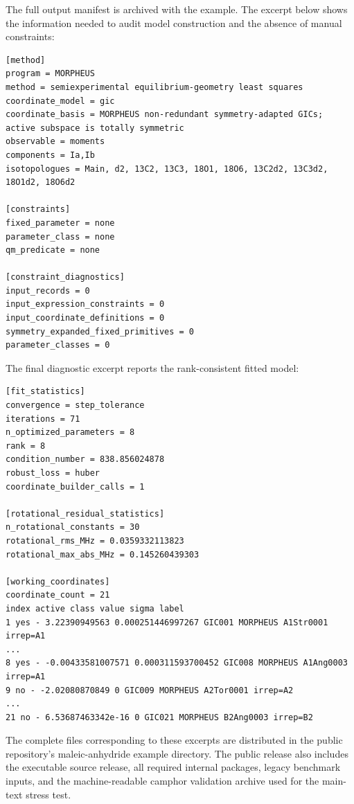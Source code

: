 \documentclass[12pt]{article}
\begin{document}
The full output manifest is archived with the example. The excerpt below shows
the information needed to audit model construction and the absence of manual
constraints:
\begin{lstlisting}
[method]
program = MORPHEUS
method = semiexperimental equilibrium-geometry least squares
coordinate_model = gic
coordinate_basis = MORPHEUS non-redundant symmetry-adapted GICs; active subspace is totally symmetric
observable = moments
components = Ia,Ib
isotopologues = Main, d2, 13C2, 13C3, 18O1, 18O6, 13C2d2, 13C3d2, 18O1d2, 18O6d2

[constraints]
fixed_parameter = none
parameter_class = none
qm_predicate = none

[constraint_diagnostics]
input_records = 0
input_expression_constraints = 0
input_coordinate_definitions = 0
symmetry_expanded_fixed_primitives = 0
parameter_classes = 0
\end{lstlisting}
The final diagnostic excerpt reports the rank-consistent fitted model:
\begin{lstlisting}
[fit_statistics]
convergence = step_tolerance
iterations = 71
n_optimized_parameters = 8
rank = 8
condition_number = 838.856024878
robust_loss = huber
coordinate_builder_calls = 1

[rotational_residual_statistics]
n_rotational_constants = 30
rotational_rms_MHz = 0.0359332113823
rotational_max_abs_MHz = 0.145260439303

[working_coordinates]
coordinate_count = 21
index active class value sigma label
1 yes - 3.22390949563 0.000251446997267 GIC001 MORPHEUS A1Str0001 irrep=A1
...
8 yes - -0.00433581007571 0.000311593700452 GIC008 MORPHEUS A1Ang0003 irrep=A1
9 no - -2.02080870849 0 GIC009 MORPHEUS A2Tor0001 irrep=A2
...
21 no - 6.53687463342e-16 0 GIC021 MORPHEUS B2Ang0003 irrep=B2
\end{lstlisting}

The complete files corresponding to these excerpts are distributed in the
public repository's maleic-anhydride example directory.
The public release also includes the executable source release, all required
internal packages, legacy benchmark inputs, and the machine-readable camphor
validation archive used for the main-text stress test.
\end{document}
